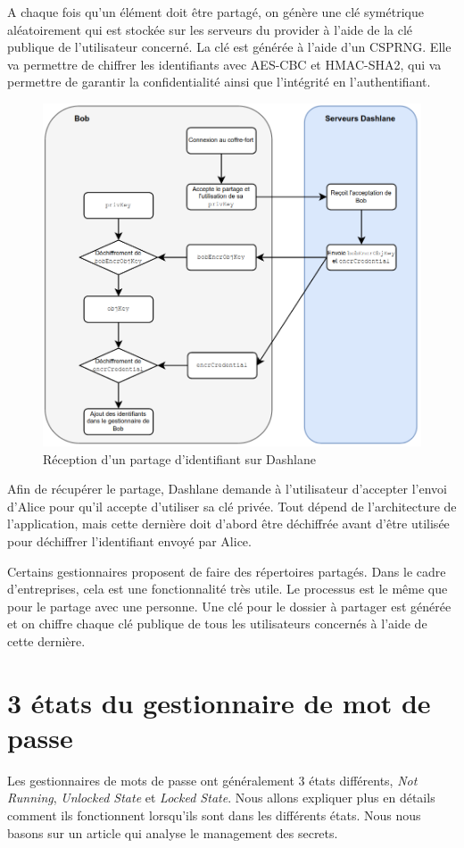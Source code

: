 A chaque fois qu'un élément doit être partagé, on génère une clé symétrique aléatoirement qui est stockée sur les serveurs du provider à l'aide de la clé publique de l'utilisateur concerné. La clé est générée à l'aide d'un CSPRNG. Elle va permettre de chiffrer les identifiants avec AES-CBC et HMAC-SHA2, qui va permettre de garantir la confidentialité ainsi que l'intégrité en l'authentifiant.
\begin{figure}[h!]
	\includegraphics[width=15.5cm]{images/dashlane_share_bob.png}
	\centering
	\caption{Réception d'un partage d'identifiant sur Dashlane}
\end{figure}

Afin de récupérer le partage, Dashlane demande à l'utilisateur d'accepter l'envoi d'Alice pour qu'il accepte d'utiliser sa clé privée. Tout dépend de l'architecture de l'application, mais cette dernière doit d'abord être déchiffrée avant d'être utilisée pour déchiffrer l'identifiant envoyé par Alice.

Certains gestionnaires proposent de faire des répertoires partagés. Dans le cadre d'entreprises, cela est une fonctionnalité très utile. Le processus est le même que pour le partage avec une personne. Une clé pour le dossier à partager est générée et on chiffre chaque clé publique de tous les utilisateurs concernés à l'aide de cette dernière.
\section{3 états du gestionnaire de mot de passe \label{etats}}
Les gestionnaires de mots de passe ont généralement 3 états différents, \textit{Not Running}, \textit{Unlocked State} et \textit{Locked State}. Nous allons expliquer plus en détails comment ils fonctionnent lorsqu'ils sont dans les différents états. Nous nous basons sur un article qui analyse le management des secrets\cite{iseexploit}.
